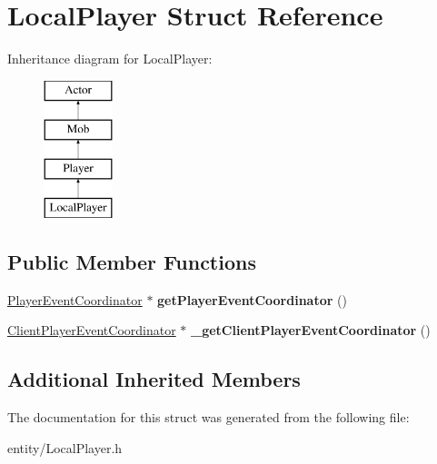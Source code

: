 \hypertarget{struct_local_player}{}\section{Local\+Player Struct Reference}
\label{struct_local_player}
Inheritance diagram for Local\+Player\+:\begin{figure}[H]
\begin{center}
\leavevmode
\includegraphics[height=4.000000cm]{struct_local_player}
\end{center}
\end{figure}
\subsection*{Public Member Functions}
\begin{DoxyCompactItemize}
\item 
\mbox{\label{struct_local_player_a2d7d7a2333a90c516d0e5f857db94c2b}} 
\mbox{\hyperlink{struct_player_event_coordinator}{Player\+Event\+Coordinator}} $\ast$ {\bfseries get\+Player\+Event\+Coordinator} ()
\item 
\mbox{\label{struct_local_player_afdf216808992191c67170cc4946206e6}} 
\mbox{\hyperlink{struct_client_player_event_coordinator}{Client\+Player\+Event\+Coordinator}} $\ast$ {\bfseries \+\_\+get\+Client\+Player\+Event\+Coordinator} ()
\end{DoxyCompactItemize}
\subsection*{Additional Inherited Members}


The documentation for this struct was generated from the following file\+:\begin{DoxyCompactItemize}
\item 
entity/Local\+Player.\+h\end{DoxyCompactItemize}
